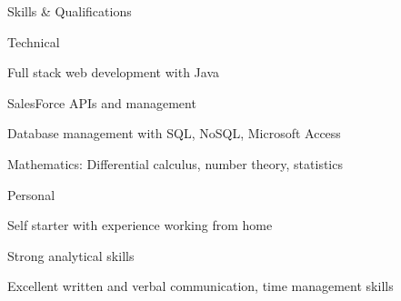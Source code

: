 \documentclass{resume} %
\begin{document}

\begin{rSection}{Skills \& Qualifications}
\begin{rSubQualificationsSection}{Technical}   %
	\item Full stack web development with Java
	\item SalesForce APIs and management
	\item Database management with SQL, NoSQL, Microsoft Access
	\item Mathematics: Differential calculus, number theory, statistics	
\end{rSubQualificationsSection}

\begin{rSubQualificationsSection}{Personal}
	\item Self starter with experience working from home
	\item Strong analytical skills
	\item Excellent written and verbal communication, time management skills
\end{rSubQualificationsSection}




\end{rSection}
\end{document}
